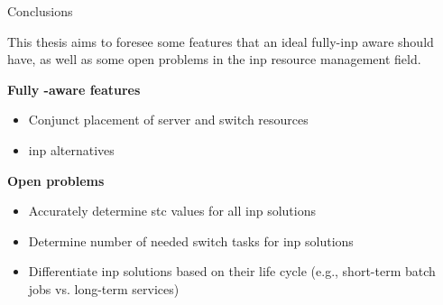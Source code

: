\begin{frame}{Conclusions}

    \small{This thesis aims to foresee some features that an ideal fully-\gls{inp} aware  should have, as well as some open problems in the \gls{inp} resource management field.}

    \vspace{3mm}

    \textbf{Fully \texorpdfstring{}{INP}-aware \texorpdfstring{}{RM} features}\\
    \begin{itemize}
        \item Conjunct placement of server and switch resources
        \item \gls{inp} alternatives 
    \end{itemize}

    \vspace{1mm}

    \textbf{Open problems}\\
    \begin{itemize}
        \item Accurately determine \gls{stc} values for all \gls{inp} solutions
        \item Determine number of needed switch tasks for \gls{inp} solutions
        \item Differentiate \gls{inp} solutions based on their life cycle (e.g., short-term batch jobs vs. long-term services)
    \end{itemize}

\end{frame}
